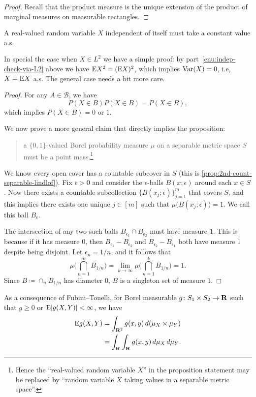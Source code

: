 \begin{proof}
    Recall that the product measure is the unique extension of the product of marginal measures on measurable rectangles.
\end{proof}

\begin{prop}
    A real-valued random variable $X$ independent of itself must take a constant value a.s.
\end{prop}

In special the case when $X \in L^2$ we have a simple proof: by part~\ref{enu:indep-check-via-L2} above we have $\mathop{}\!\mathrm{E} X^2 = (\mathop{}\!\mathrm{E} X)^2$, which implies $\operatorname{Var}(X) = 0$, i.e, $X = \mathop{}\!\mathrm{E} X$ a.s. The general case needs a bit more care.

\begin{proof}
    For any $A\in \mathcal B$, we have \[
    	P(X\in B)P(X\in B) = P(X \in B),
    \] which implies $P(X \in B) = 0$ or $1$.
	
    We now prove a more general claim that directly implies the proposition: 
    \begin{quote}
        a $\{0,1\}$-valued Borel probability measure $\mu$ on a separable metric space $S$ must be a point mass.\footnote{Hence the ``real-valued random variable $X$'' in the proposition statement may be replaced by ``random variable $X$ taking values in a separable metric space''.}
    \end{quote}
    We know every open cover has a countable subcover in $S$ (this is \cref{prop:2nd-count-separable-lindlof}). Fix $\epsilon >0$ and consider the $\epsilon$-balls $B(x;\epsilon)$ around each $x\in S$. Now there exists a countable subcollection $\{B(x_j;\epsilon)\}_{j=1}^m$ that covers $S$, and this implies there exists one unique $j\in [m]$ such that $\mu\bigl(B(x_j;\epsilon)\bigr) = 1$. We call this ball $B_\epsilon$.

    The intersection of any two such balls $B_{\epsilon_1}\cap B_{\epsilon_2}$ must have measure $1$. This is because if it has measure $0$, then $B_{\epsilon_1} - B_{\epsilon_2}$ and $B_{\epsilon_2} - B_{\epsilon_1}$ both have measure $1$ despite being disjoint. Let $\epsilon_n = 1/n$, and it follows that \[
        \mu\biggl(\bigcap_{n=1}^\infty B_{1/n}\biggr) = \lim_{k\to \infty} \mu\biggl(\bigcap_{n=1}^k B_{1/n}\biggr) = 1.
    \] Since $B\coloneqq \cap_{n} B_{1/n}$ has diameter $0$, $B$ is a singleton set of measure $1$.
\end{proof}

As a consequence of Fubini--Tonelli, for Borel measurable $g\colon S_1\times S_2 \to \mathbf{R}$ such that $g \geq 0$ or $\mathop{}\!\mathrm{E} \lvert g(X,Y) \rvert < \infty$, we have \begin{align*}
        \mathop{}\!\mathrm{E} g(X,Y) & = \int_{\mathbf{R}^2} g(x,y)\,d(\mu_X \times \mu_Y) \\ & = \int_{\mathbf{R}}\int_{\mathbf{R}} g(x,y)\,d\mu_X \,d \mu_Y.
    \end{align*}


